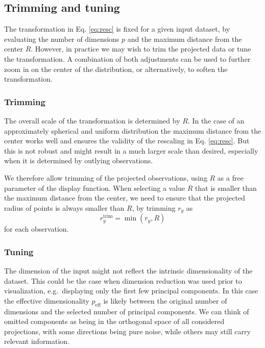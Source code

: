 \documentclass[]{interact}
\theoremstyle{plain}%
\theoremstyle{definition}
\theoremstyle{remark}
\begin{document}
\hypertarget{sec:params}{%
\subsection{Trimming and tuning}\label{sec:params}}

The transformation in Eq. \ref{eq:resc} is fixed for a given input
dataset, by evaluating the number of dimensions \(p\) and the maximum
distance from the center \(R\). However, in practice we may wish to trim
the projected data or tune the transformation. A combination of both
adjustments can be used to further zoom in on the center of the
distribution, or alternatively, to soften the transformation.

\hypertarget{trimming}{%
\subsubsection{Trimming}\label{trimming}}

The overall scale of the transformation is determined by \(R\). In the
case of an approximately spherical and uniform distribution the maximum
distance from the center works well and ensures the validity of the
rescaling in Eq. \ref{eq:resc}. But this is not robust and might result
in a much larger scale than desired, especially when it is determined by
outlying observations.

We therefore allow trimming of the projected observations, using \(R\)
as a free parameter of the display function. When selecting a value
\(R\) that is smaller than the maximum distance from the center, we need
to ensure that the projected radius of points is always smaller than
\(R\), by trimming \(r_y\) as \begin{equation}
r_y^{\mathrm{trim}} = \min(r_y, R)
\label{eq:cutR}
\end{equation} for each observation.

\hypertarget{tuning}{%
\subsubsection{Tuning}\label{tuning}}

The dimension of the input might not reflect the intrinsic
dimensionality of the dataset. This could be the case when dimension
reduction was used prior to visualization, e.g.~displaying only the
first few principal components. In this case the effective
dimensionality \(p_{\mathrm{eff}}\) is likely between the original
number of dimensions and the selected number of principal components. We
can think of omitted components as being in the orthogonal space of all
considered projections, with some directions being pure noise, while
others may still carry relevant information.
\end{document}
